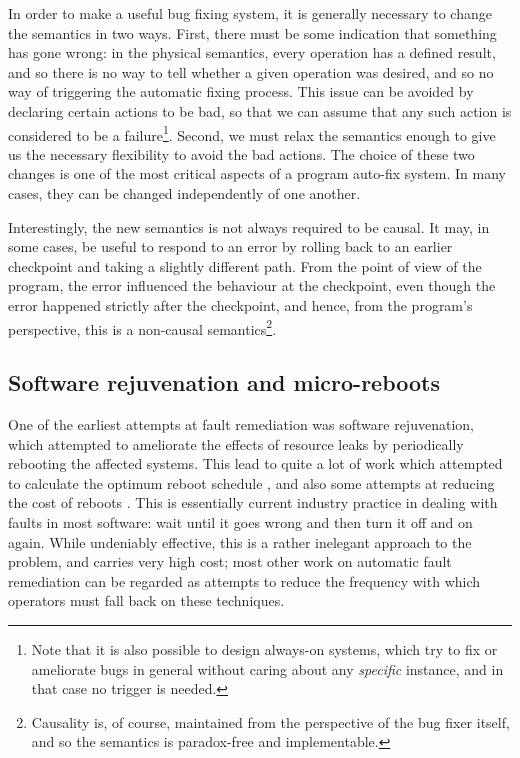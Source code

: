 In order to make a useful bug fixing system, it is generally necessary
to change the semantics in two ways.  First, there must be some
indication that something has gone wrong: in the physical semantics,
every operation has a defined result, and so there is no way to tell
whether a given operation was desired, and so no way of triggering the
automatic fixing process.  This issue can be avoided by declaring
certain actions to be bad, so that we can assume that any such action
is considered to be a failure\footnote{Note that it is also possible
  to design always-on systems, which try to fix or ameliorate bugs in
  general without caring about any \emph{specific} instance, and in
  that case no trigger is needed.}.  Second, we must relax the
semantics enough to give us the necessary flexibility to avoid the bad
actions.  The choice of these two changes is one of the most critical
aspects of a program auto-fix system.  In many cases, they can be
changed independently of one another.

Interestingly, the new semantics is not always required to be causal.
It may, in some cases, be useful to respond to an error by rolling
back to an earlier checkpoint and taking a slightly different path.
From the point of view of the program, the error influenced the
behaviour at the checkpoint, even though the error happened strictly
after the checkpoint, and hence, from the program's perspective, this
is a non-causal semantics\footnote{Causality is, of course, maintained
  from the perspective of the bug fixer itself, and so the semantics
  is paradox-free and implementable.}.

\subsection{Software rejuvenation and micro-reboots}

One of the earliest attempts at fault remediation was software
rejuvenation\cite{Huang1995}, which attempted to ameliorate the
effects of resource leaks by periodically rebooting the affected
systems.  This lead to quite a lot of work which attempted to
calculate the optimum reboot schedule
\cite{Li2002,Vaidyanathan2001,Garg1998}, and also some attempts at
reducing the cost of reboots \cite{Candea2002,Patterson2002}.  This is
essentially current industry practice in dealing with faults in most
software: wait until it goes wrong and then turn it off and on again.
While undeniably effective, this is a rather inelegant approach to the
problem, and carries very high cost; most other work on automatic
fault remediation can be regarded as attempts to reduce the frequency
with which operators must fall back on these techniques.

